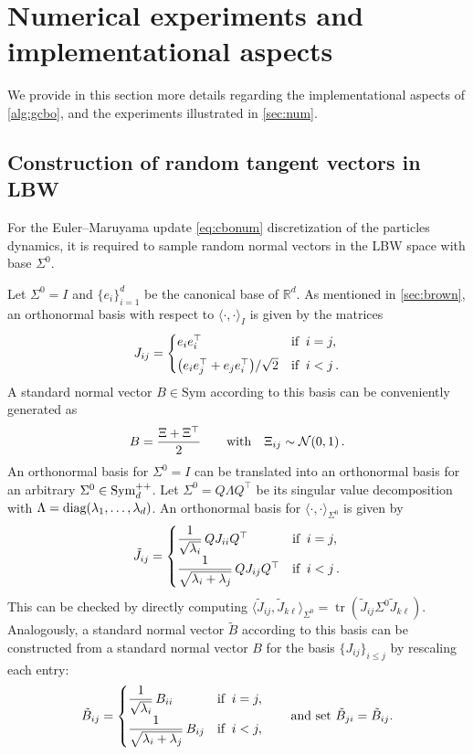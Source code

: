 \documentclass{article}
\theoremstyle{plain}
\theoremstyle{definition}
\theoremstyle{remark}
\newcommand{\pd}{\textup{Sym}^{++}_d}
\begin{document}
\section{Numerical experiments and implementational aspects }
\label{app:num}

We provide in this section more details regarding the implementational aspects of \cref{alg:gcbo}, and the experiments illustrated in \cref{sec:num}.

\subsection{Construction of random tangent vectors in LBW} \label{app:random}
For the Euler--Maruyama update \eqref{eq:cbonum} discretization of the particles dynamics, it is required to sample random normal vectors in the LBW space with base $\Sigma^0$. 

Let $\Sigma^0 = I$ and $\{e_i\}_{i=1}^d$ be the canonical base of $\mathbb{R}^d$. As mentioned in \cref{sec:brown}, an orthonormal basis with respect to $\langle \cdot, \cdot \rangle_{I}$ is given by the matrices
\[
J_{ij} =
\begin{cases}
e_i e_i^\top & \textup{if} \;\; i = j,\\[4pt]
\big(e_i e_j^\top + e_j e_i^\top\big)/\sqrt{2} & \textup{if} \;\; i < j \, .
\end{cases}
\]
A standard normal vector $B \in \mathrm{Sym}$ according to this basis can be conveniently generated as
\[
B = \frac{\Xi + \Xi^\top}{2}
\qquad \textup{with}\quad \Xi_{ij} \sim \mathcal{N}(0,1)\, .
\]
An orthonormal basis for $\Sigma^0 = I$ can be translated into an orthonormal basis for an arbitrary $\Sigma^0 \in \pd$. Let $\Sigma^0 = Q \Lambda Q^\top$ be its singular value decomposition with $\Lambda = \textup{diag}(\lambda_1,\dots,\lambda_d)$. An orthonormal basis for $\langle \cdot, \cdot \rangle_{\Sigma^0}$ is given by
\[
\tilde J_{ij} =
\begin{cases}
\dfrac{1}{\sqrt{\lambda_i}}\, Q J_{ii} Q^\top & \textup{if} \;\; i=j,\\[6pt]
\dfrac{1}{\sqrt{\lambda_i + \lambda_j}}\, Q J_{ij} Q^\top & \textup{if} \;\; i<j \, .
\end{cases}
\]
This can be checked by directly computing $\langle \tilde J_{ij}, \tilde J_{k\ell} \rangle_{\Sigma^0} = \operatorname{tr}(\tilde J_{ij}\Sigma^0 \tilde J_{k\ell})$. Analogously, a standard normal vector $\tilde B$ according to this basis can be constructed from a standard normal vector $B$ for the basis $\{J_{ij}\}_{i \leq j}$ by rescaling each entry:
\[
\tilde B_{ij} =
\begin{cases}
\dfrac{1}{\sqrt{\lambda_i}}\, B_{ii} & \textup{if} \;\; i=j,\\[6pt]
\dfrac{1}{\sqrt{\lambda_i + \lambda_j}}\, B_{ij} & \textup{if} \;\; i<j,
\end{cases}
\qquad \text{and set } \tilde B_{ji} = \tilde B_{ij}.
\]
\end{document}
